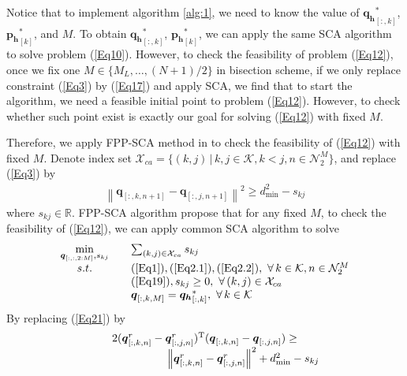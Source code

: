 \documentclass[10pt,final,conference]{IEEEtran}
\begin{document}
Notice that to implement algorithm \ref{alg:1}, we need to know the value of $\boldsymbol{q_h}^*_{[:,k]}$, $\boldsymbol{p_h}^*_{[k]}$, and $M$. To obtain $\boldsymbol{q_h}^*_{[:,k]}$, $\boldsymbol{p_h}^*_{[k]}$, we can apply the same SCA algorithm to solve problem (\ref{Eq10}). However, to check the feasibility of problem (\ref{Eq12}), once we fix one $M\in\{M_L,\ldots,(N+1)/2\}$ in bisection scheme, if we only replace constraint (\ref{Eq3}) by (\ref{Eq17}) and apply SCA, we find that to start the algorithm, we need a feasible initial point to problem (\ref{Eq12}). However, to check whether such point exist is exactly our goal for solving (\ref{Eq12}) with fixed $M$.

Therefore, we apply FPP-SCA method in \cite{IEEEexample:6954488} to check the feasibility of (\ref{Eq12}) with fixed $M$. Denote index set $\mathcal{X}_{ca}=\{(k,j)\,|\,k,j\in\mathcal{K},k<j,n\in\mathcal{N}_2^M\}$, and replace (\ref{Eq3}) by
\begin{equation}\label{Eq19}
	\begin{array}{c}
		\left\lVert\boldsymbol{q}_{[:,k,n+1]}-\boldsymbol{q}_{[:,j,n+1]}\right\rVert^2\geq d_{\min}^2-s_{kj}
	\end{array}
\end{equation}
where $s_{kj}\in\mathbb{R}$. FPP-SCA algorithm propose that for any fixed $M$, to check the feasibility of (\ref{Eq12}), we can apply common SCA algorithm to solve
\begin{equation}\label{Eq20}
	\begin{array}{cll}
		\min\limits_{\substack{\boldsymbol{q}_{[:,:,2:M]},s_{kj}}} \quad & \sum_{(k,j)\in\mathcal{X}_{ca}}s_{kj} \\ 
		s.t. \quad & (\ref{Eq1}),(\ref{Eq2.1}),(\ref{Eq2.2}),\ \forall\,k\in\mathcal{K},n\in\mathcal{N}_2^M \\
		& (\ref{Eq19}),s_{kj} \geq 0,\ \forall\,(k,j)\in \mathcal{X}_{ca} \\
		& \boldsymbol{q}_{[:,k,M]}=\boldsymbol{q_h}^*_{[:,k]},\  \forall\,k\in\mathcal{K} 
	\end{array}
\end{equation}
By replacing (\ref{Eq21}) by
\begin{equation}\label{Eq21}
	\begin{array}{c}
		2(\boldsymbol{q}^r_{[:,k,n]}-\boldsymbol{q}^r_{[:,j,n]})^{\rm T}(\boldsymbol{q}_{[:,k,n]}-\boldsymbol{q}_{[:,j,n]})\geq  \\
		\quad\qquad\qquad\qquad\left\lVert\boldsymbol{q}^r_{[:,k,n]}-\boldsymbol{q}^r_{[:,j,n]}\right\rVert^2+d_{\min}^2-s_{kj}
	\end{array}
\end{equation}
\end{document}
